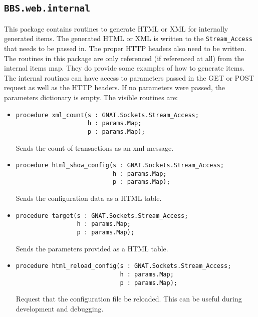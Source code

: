 \documentclass[10pt, openany]{book}
\newcommand{\package}[1]{\texttt{#1}}
\newcommand{\datatype}[1]{\texttt{#1}}
\begin{document}
\subsection{\package{BBS.web.internal}}
This package contains routines to generate HTML or XML for internally generated items.  The generated HTML or XML is written to the \datatype{Stream\_Access} that needs to be passed in.  The proper HTTP headers also need to be written.  The routines in this package are only referenced (if referenced at all) from the internal items map.  They do provide some examples of how to generate items.  The internal routines can have access to parameters passed in the GET or POST request as well as the HTTP headers.  If no parameters were passed, the parameters dictionary is empty.  The visible routines are:
\begin{itemize}
  \item \begin{lstlisting}
procedure xml_count(s : GNAT.Sockets.Stream_Access;
                    h : params.Map;
                    p : params.Map);
\end{lstlisting}
  Sends the count of transactions as an xml message.
  \item \begin{lstlisting}
procedure html_show_config(s : GNAT.Sockets.Stream_Access;
                           h : params.Map;
                           p : params.Map);
\end{lstlisting}
  Sends the configuration data as a HTML table.
  \item \begin{lstlisting}
procedure target(s : GNAT.Sockets.Stream_Access;
                 h : params.Map;
                 p : params.Map);
\end{lstlisting}
  Sends the parameters provided as a HTML table.
  \item \begin{lstlisting}
procedure html_reload_config(s : GNAT.Sockets.Stream_Access;
                             h : params.Map;
                             p : params.Map);
\end{lstlisting}
  Request that the configuration file be reloaded.  This can be useful during development and debugging.
\end{itemize}
\end{document}
